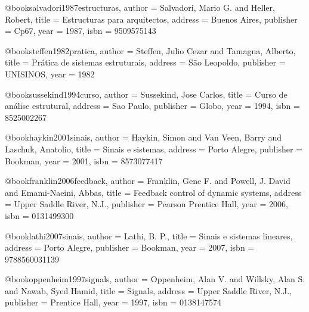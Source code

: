 @book{salvadori1987estructuras,
  author = {Salvadori, Mario G. and Heller, Robert},
  title = {Estructuras para arquitectos},
  address = {Buenos Aires},
  publisher = {Cp67},
  year = {1987},
  isbn = {9509575143}
}

@book{steffen1982pratica,
  author = {Steffen, Julio Cezar and Tamagna, Alberto},
  title = {Prática de sistemas estruturais},
  address = {São Leopoldo},
  publisher = {UNISINOS},
  year = {1982}
}

@book{sussekind1994curso,
  author = {Sussekind, Jose Carlos},
  title = {Curso de análise estrutural},
  address = {Sao Paulo},
  publisher = {Globo},
  year = {1994},
  isbn = {8525002267}
}

%

@book{haykin2001sinais,
  author = {Haykin, Simon and Van Veen, Barry and Laschuk, Anatolio},
  title = {Sinais e sistemas},
  address = {Porto Alegre},
  publisher = {Bookman},
  year = {2001},
  isbn = {8573077417}
}

@book{franklin2006feedback,
  author = {Franklin, Gene F. and Powell, J. David and Emami-Naeini, Abbas},
  title = {Feedback control of dynamic systems},
  address = {Upper Saddle River, N.J.},
  publisher = {Pearson Prentice Hall},
  year = {2006},
  isbn = {0131499300}
}

@book{lathi2007sinais,
  author = {Lathi, B. P.},
  title = {Sinais e sistemas lineares},
  address = {Porto Alegre},
  publisher = {Bookman},
  year = {2007},
  isbn = {9788560031139}
}

@book{oppenheim1997signals,
  author = {Oppenheim, Alan V. and Willsky, Alan S. and Nawab, Syed Hamid},
  title = {Signals},
  address = {Upper Saddle River, N.J.},
  publisher = {Prentice Hall},
  year = {1997},
  isbn = {0138147574}
}

